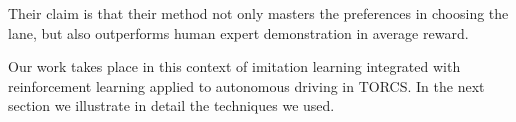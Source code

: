 Their claim is that their method not only masters the preferences in choosing the lane, but also outperforms human expert demonstration in
average reward.



Our work takes place in this context of imitation learning integrated with reinforcement learning applied to autonomous driving in TORCS.
In the next section we illustrate in detail the techniques we used. 
